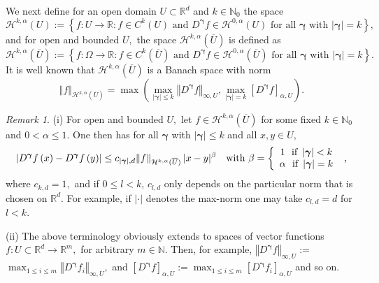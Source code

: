 \documentclass[a4paper,11pt]{amsart}
\theoremstyle{plain}
\theoremstyle{remark}
\newtheorem{remark}[theorem]{Remark}
\begin{document}
We next define for an open domain $U\subset\mathbb{R}^{d}$ and $k\in
\mathbb{N}_{0}$ the space%
\[
\mathcal{H}^{k,\alpha}(U):=\left\{  f:U\rightarrow\mathbb{R}:f\in
C^{k}(U)\text{ and }D^{{\boldsymbol{\gamma}}}f\in\mathcal{H}^{0,\alpha
}(U)\text{ for all }{\boldsymbol{\gamma}}\text{ with }\left\vert
{\boldsymbol{\gamma}}\right\vert =k\right\}  ,
\]
and for open and bounded $U,$ the space $\mathcal{H}^{k,\alpha}(\overline{U})$
is defined as%
\[
\mathcal{H}^{k,\alpha}(\overline{U}):=\left\{  f:\Omega\rightarrow
\mathbb{R}:f\in C^{k}(\overline{U})\text{ and }D^{{\boldsymbol{\gamma}}}%
f\in\mathcal{H}^{0,\alpha}(\overline{U})\text{ for all }{\boldsymbol{\gamma}%
}\text{ with }\left\vert {\boldsymbol{\gamma}}\right\vert =k\right\}  .
\]
It is well known that $\mathcal{H}^{k,\alpha}(\overline{U})$ is a Banach space
with norm%
\[
\Vert f\Vert_{\mathcal{H}^{k,\alpha}(\overline{U})}=\max\left(  \max
_{\left\vert {\boldsymbol{\gamma}}\right\vert \leq k}\left\Vert
D^{{\boldsymbol{\gamma}}}f\right\Vert _{\infty,U},\max_{\left\vert
{\boldsymbol{\gamma}}\right\vert =k}[D^{{\boldsymbol{\gamma}}}f]_{\alpha
,U}\right)  .
\]


\begin{remark}\label{remHoel}
(i) For open and bounded $U,$ let $f\in\mathcal{H}^{k,\alpha}(\overline{U})$ for some fixed
$k\in\mathbb{N}_{0}$ and $0<\alpha\leq1.$ One then has for all
${\boldsymbol{\gamma}}$ with $\left\vert {\boldsymbol{\gamma}}\right\vert \leq
k$ and all $x,y\in U,$%
\[
\left\vert D^{{\boldsymbol{\gamma}}}f\left(  x\right)  -D^{{\boldsymbol{\gamma
}}}f\left(  y\right)  \right\vert \leq c_{\left\vert {\boldsymbol{\gamma}}\right\vert,d}\Vert f\Vert_{\mathcal{H}%
^{k,\alpha}(\overline{U})}\,|x-y|^{\beta}\text{ \ \ with }\beta=\left\{
\begin{array}
[c]{c}%
1\text{ \ if }\left\vert {\boldsymbol{\gamma}}\right\vert <k\\
\alpha\text{ \ if }\left\vert {\boldsymbol{\gamma}}\right\vert =k
\end{array}
\right.  \text{ ,}%
\]
where $c_{k,d}=1,$ and if $0\leq l<k$, $c_{l,d}$ only depends on the particular norm that is chosen on
$\mathbb{R}^{d}.$ For example, if $|\cdot|$ denotes the max-norm one may take
$c_{l,d}=
{d}$  for $l <k$.

(ii) The above terminology obviously extends to spaces of vector functions
$f:U\subset\mathbb{R}^{d}\rightarrow\mathbb{R}^{m},$ for arbitrary
$m\in\mathbb{N}$. Then, for example, $\left\Vert D^{{\boldsymbol{\gamma}}%
}f\right\Vert _{\infty,U}:=$ $\max_{1\leq i\leq m}\left\Vert
D^{{\boldsymbol{\gamma}}}f_{i}\right\Vert _{\infty,U},$ and
$[D^{{\boldsymbol{\gamma}}}f]_{\alpha,U}:=\max_{1\leq i\leq m}%
[D^{{\boldsymbol{\gamma}}}f_{i}]_{\alpha,U}$ and so on.
\end{remark}
\end{document}
